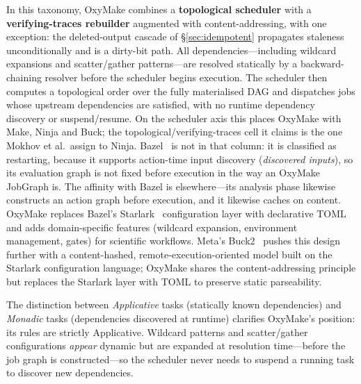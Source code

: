 \documentclass[12pt,a4paper]{article}
\begin{document}
In this taxonomy, OxyMake combines a \textbf{topological scheduler} with a
\textbf{verifying-traces rebuilder} augmented with content-addressing,
with one exception: the deleted-output cascade of
\S\ref{sec:idempotent} propagates staleness unconditionally and is a
dirty-bit path. All
dependencies---including wildcard expansions and scatter/gather
patterns---are resolved statically by a backward-chaining resolver before
the scheduler begins execution. The scheduler then computes a topological
order over the fully materialised DAG and dispatches jobs whose upstream
dependencies are satisfied, with no runtime dependency discovery or
suspend/resume. On the scheduler axis this places OxyMake with Make,
Ninja and Buck; the topological/verifying-traces cell it claims is the
one Mokhov et al.\ assign to Ninja. Bazel~\cite{bazel} is not in that
column: it is classified as restarting, because it supports action-time
input discovery (\emph{discovered inputs}), so its evaluation graph is
not fixed before execution in the way an OxyMake JobGraph is. The
affinity with Bazel is elsewhere---its analysis phase likewise
constructs an action graph before execution, and it likewise caches on
content. OxyMake replaces Bazel's Starlark~\cite{starlark}
configuration layer with declarative TOML and adds
domain-specific features (wildcard expansion, environment management, gates)
for scientific workflows.  Meta's Buck2~\cite{buck2} pushes this design further
with a content-hashed, remote-execution-oriented model built on the
Starlark configuration language; OxyMake shares the content-addressing principle but
replaces the Starlark layer with TOML to preserve static parseability.

The distinction between \emph{Applicative} tasks (statically known
dependencies) and \emph{Monadic} tasks (dependencies discovered at runtime)
clarifies OxyMake's position: its rules are strictly Applicative.  Wildcard
patterns and scatter/gather configurations \emph{appear} dynamic but are
expanded at resolution time---before the job graph is constructed---so the
scheduler never needs to suspend a running task to discover new
dependencies.
\end{document}
